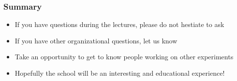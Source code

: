 \begin{frame}
\frametitle{Summary}

\begin{itemize}
\item If you have questions during the lectures, please do not hestiate to ask
\item If you have other organizational questions, let us know
\item Take an opportunity to get to know people working on other experiments
\item Hopefully the school will be an interesting and educational experience!
\end{itemize}

\end{frame}


